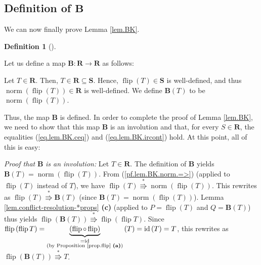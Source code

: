 \documentclass[numbers=enddot,12pt,final,onecolumn,notitlepage]{scrartcl}%
\theoremstyle{definition}
\newtheorem{defi}[theo]{Definition}
\newenvironment{definition}[1][]
{\begin{defi}[#1]\begin{leftbar}}
{\end{leftbar}\end{defi}}
\begin{document}
\subsection{Definition of $\mathbf{B}$}

We can now finally prove Lemma \ref{lem.BK}.

\begin{definition}
Let us define a map $\mathbf{B}:\mathbf{R}\rightarrow\mathbf{R}$ as follows:

Let $T\in\mathbf{R}$. Then, $T\in\mathbf{R}\subseteq\mathbf{S}$. Hence,
$\operatorname*{flip}\left(  T\right)  \in\mathbf{S}$ is well-defined, and
thus $\operatorname*{norm}\left(  \operatorname*{flip}\left(  T\right)
\right)  \in\mathbf{R}$ is well-defined. We define $\mathbf{B}\left(
T\right)  $ to be $\operatorname*{norm}\left(  \operatorname*{flip}\left(
T\right)  \right)  $.
\end{definition}

Thus, the map $\mathbf{B}$ is defined. In order to complete the proof of Lemma
\ref{lem.BK}, we need to show that this map $\mathbf{B}$ is an involution and
that, for every $S\in\mathbf{R}$, the equalities (\ref{eq.lem.BK.ceq}) and
(\ref{eq.lem.BK.ircont}) hold. At this point, all of this is easy:

\textit{Proof that }$\mathbf{B}$ \textit{is an involution:} Let $T\in
\mathbf{R}$. The definition of $\mathbf{B}$ yields $\mathbf{B}\left(
T\right)  =\operatorname*{norm}\left(  \operatorname*{flip}\left(  T\right)
\right)  $. From (\ref{pf.lem.BK.norm.=>}) (applied to $\operatorname*{flip}%
\left(  T\right)  $ instead of $T$), we have $\operatorname*{flip}\left(
T\right)  \overset{\ast}{\Rrightarrow}\operatorname*{norm}\left(
\operatorname*{flip}\left(  T\right)  \right)  $. This rewrites as
$\operatorname*{flip}\left(  T\right)  \overset{\ast}{\Rrightarrow}%
\mathbf{B}\left(  T\right)  $ (since $\mathbf{B}\left(  T\right)
=\operatorname*{norm}\left(  \operatorname*{flip}\left(  T\right)  \right)
$). Lemma \ref{lem.conflict-resolution-*props} \textbf{(c)} (applied to
$P=\operatorname*{flip}\left(  T\right)  $ and $Q=\mathbf{B}\left(  T\right)
$) thus yields $\operatorname*{flip}\left(  \mathbf{B}\left(  T\right)
\right)  \overset{\ast}{\Rrightarrow}\operatorname*{flip}\left(
\operatorname*{flip}T\right)  $. Since $\operatorname*{flip}\left(
\operatorname*{flip}T\right)  =\underbrace{\left(  \operatorname*{flip}%
\circ\operatorname*{flip}\right)  }_{\substack{=\operatorname*{id}\\\text{(by
Proposition \ref{prop.flip} \textbf{(a)})}}}\left(  T\right)
=\operatorname*{id}\left(  T\right)  =T$, this rewrites as
$\operatorname*{flip}\left(  \mathbf{B}\left(  T\right)  \right)
\overset{\ast}{\Rrightarrow}T$.
\end{document}
